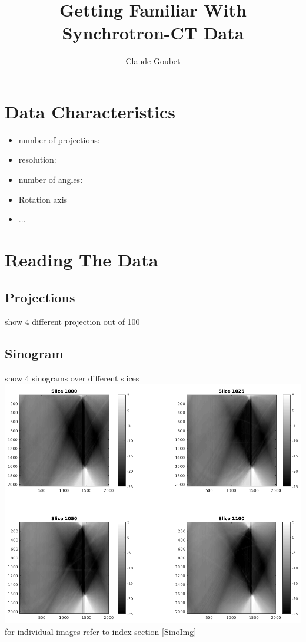 \documentclass[10pt,a4paper,titlepage]{article}
\author{Claude Goubet}
\title{Getting Familiar With Synchrotron-CT Data}
\begin{document}
\maketitle


\section{Data Characteristics}
\begin{itemize}
	\item number of projections:
	\item resolution:
	\item number of angles:
	\item Rotation axis
	\item ...
	
\end{itemize}

\section{Reading The Data}
	\subsection{Projections}
		show 4 different projection out of 100
	\subsection{Sinogram}
		show 4 sinograms over different slices\\
		\includegraphics[width=\textwidth]{sinograms/Sinograms2.png}	
		for individual images refer to index section \ref{SinoImg}
\end{document}
